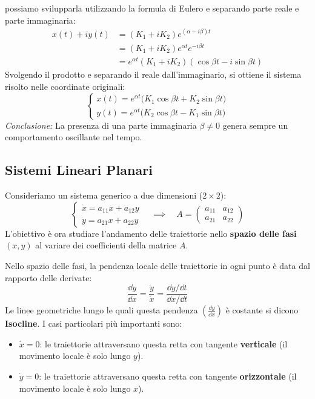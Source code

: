 \documentclass[openany]{book}
\theoremstyle{definition}
\theoremstyle{remark}
\begin{document}
possiamo svilupparla utilizzando la formula di Eulero e separando parte reale e parte immaginaria:
\begin{align*}
    x(t) + iy(t) &= (K_1 + iK_2) e^{(\alpha - i\beta)t} \\
    &= (K_1 + iK_2) e^{\alpha t} e^{-i\beta t} \\
    &= e^{\alpha t} (K_1 + iK_2) (\cos \beta t - i \sin \beta t)
\end{align*}
Svolgendo il prodotto e separando il reale dall'immaginario, si ottiene il sistema risolto nelle coordinate originali:
\begin{equation}
    \begin{cases}
        x(t) = e^{\alpha t} \big( K_1 \cos \beta t + K_2 \sin \beta t \big) \\
        y(t) = e^{\alpha t} \big( K_2 \cos \beta t - K_1 \sin \beta t \big)
    \end{cases}
\end{equation}
\textit{Conclusione:} La presenza di una parte immaginaria $\beta \neq 0$ genera sempre un comportamento oscillante nel tempo.

\subsection{Sistemi Lineari Planari}

Consideriamo un sistema generico a due dimensioni ($2 \times 2$):
\begin{equation}
    \begin{cases}
        \dot{x} = a_{11}x + a_{12}y \\
        \dot{y} = a_{21}x + a_{22}y
    \end{cases}
    \quad \implies \quad 
    A = \begin{pmatrix} a_{11} & a_{12} \\ a_{21} & a_{22} \end{pmatrix}
\end{equation}
L'obiettivo è ora studiare l'andamento delle traiettorie nello \textbf{spazio delle fasi} $(x, y)$ al variare dei coefficienti della matrice $A$.

Nello spazio delle fasi, la pendenza locale delle traiettorie in ogni punto è data dal rapporto delle derivate:
\begin{equation}
    \frac{\dd y}{\dd x} = \frac{\dot{y}}{\dot{x}} = \frac{\dd y / \dd t}{\dd x / \dd t}
\end{equation}
Le linee geometriche lungo le quali questa pendenza $\left(\frac{\dd y}{\dd x}\right)$ è costante si dicono \textbf{Isocline}.
I casi particolari più importanti sono:
\begin{itemize}
    \item $\dot{x} = 0$: le traiettorie attraversano questa retta con tangente \textbf{verticale} (il movimento locale è solo lungo $y$).
    \item $\dot{y} = 0$: le traiettorie attraversano questa retta con tangente \textbf{orizzontale} (il movimento locale è solo lungo $x$).
\end{itemize}
\end{document}
